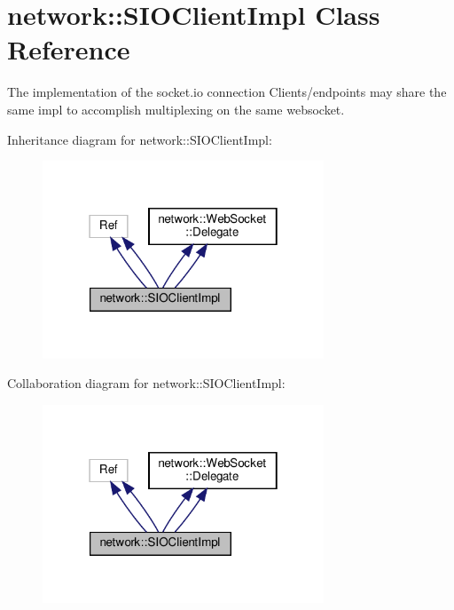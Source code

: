 \hypertarget{classnetwork_1_1SIOClientImpl}{}\section{network\+:\+:S\+I\+O\+Client\+Impl Class Reference}
\label{classnetwork_1_1SIOClientImpl}


The implementation of the socket.\+io connection Clients/endpoints may share the same impl to accomplish multiplexing on the same websocket.  




Inheritance diagram for network\+:\+:S\+I\+O\+Client\+Impl\+:
\nopagebreak
\begin{figure}[H]
\begin{center}
\leavevmode
\includegraphics[width=238pt]{classnetwork_1_1SIOClientImpl__inherit__graph}
\end{center}
\end{figure}


Collaboration diagram for network\+:\+:S\+I\+O\+Client\+Impl\+:
\nopagebreak
\begin{figure}[H]
\begin{center}
\leavevmode
\includegraphics[width=238pt]{classnetwork_1_1SIOClientImpl__coll__graph}
\end{center}
\end{figure}
